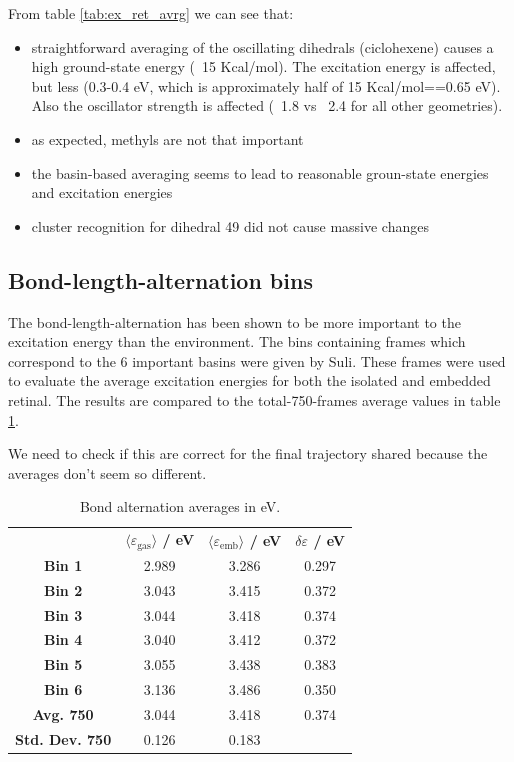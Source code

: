 \documentclass[twoside, 12pt]{article}
\begin{document}
From table \ref{tab:ex_ret_avrg} we can see that:
\begin{itemize}
 \item straightforward averaging of the oscillating dihedrals (ciclohexene) causes a high ground-state energy (~15 Kcal/mol). The excitation energy is affected, but less (0.3-0.4 eV, which is approximately half of 15 Kcal/mol==0.65 eV).
 Also the oscillator strength is affected (~1.8 vs ~2.4 for all other geometries).
 \item as expected, methyls are not that important
 \item the basin-based averaging seems to lead to reasonable groun-state energies and excitation energies
 \item cluster recognition for dihedral 49 did not cause massive changes
\end{itemize}


\subsection{Bond-length-alternation bins}
The bond-length-alternation has been shown to be more important to the excitation energy than the environment. The bins containing frames which correspond to the 6 important basins were given by Suli. These frames were used to evaluate the average excitation energies for both the isolated and embedded retinal. The results are compared to the total-750-frames average values in table \ref{tab:ex_bins}.

We need to check if this are correct for the final trajectory shared because the averages don't seem so different.

\begin{table}[h]
\footnotesize
\centering
\caption{Bond alternation averages in eV.}
\label{tab:ex_bins}
\begin{tabular}{cccc}
& \textbf{$\langle \varepsilon_\mathrm{gas} \rangle$ / eV} & \textbf{$\langle \varepsilon_\mathrm{emb} \rangle$ / eV} & \textbf{$\delta \varepsilon$ / eV}  \\ 
\textbf{Bin 1} & 2.989 & 3.286 & 0.297\\ 
\textbf{Bin 2} & 3.043 & 3.415 & 0.372\\ 
\textbf{Bin 3} & 3.044 & 3.418 & 0.374\\ 
\textbf{Bin 4} & 3.040 & 3.412 & 0.372\\ 
\textbf{Bin 5} & 3.055 & 3.438 & 0.383\\ 
\textbf{Bin 6} & 3.136 & 3.486 & 0.350\\ 
\textbf{Avg. 750} &  3.044 & 3.418 & 0.374\\ 
\textbf{Std. Dev. 750} &  0.126 & 0.183 &\\ 
\end{tabular}
\end{table}


\clearpage
%

\end{document}
